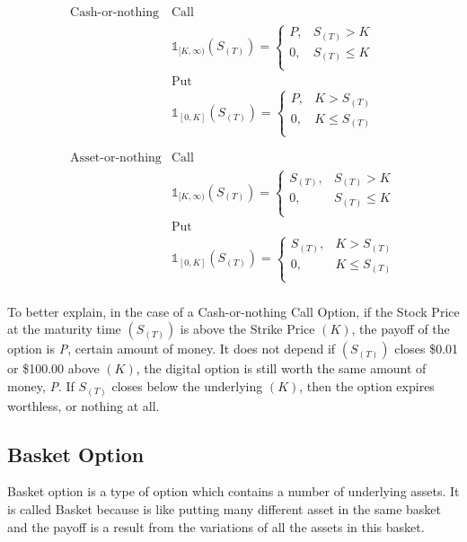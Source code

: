 \documentclass[]{elsarticle}
\theoremstyle{definition}
\theoremstyle{remark}
\begin{document}
$$ \begin{array}{rcc}
\text{Cash-or-nothing} & \text{Call}\\
 & \mathbb{1}_{[K,\infty)}(S_{(T)})=
\begin{cases}
P, & S_{(T)} > K \\
0, & S_{(T)} \leq K\\
\end{cases}\\
 & \text{Put}\\
 & \mathbb{1}_{[0,K]}(S_{(T)})=
\begin{cases}
P, & K > S_{(T)} \\
0, & K \leq S_{(T)}\\
\end{cases} \\
\\
\\
\text{Asset-or-nothing} & \text{Call}\\
& \mathbb{1}_{[K,\infty)}(S_{(T)})=
\begin{cases}
S_{(T)}, & S_{(T)} > K \\
0, & S_{(T)} \leq K\\
\end{cases}\\
& \text{Put}\\
& \mathbb{1}_{[0,K]}(S_{(T)})=
\begin{cases}
S_{(T)}, & K > S_{(T)} \\
0, & K \leq S_{(T)}\\
\end{cases} \\
\end{array} $$

To better explain, in the case of a Cash-or-nothing Call Option, if the Stock Price at the maturity time $(S_{(T)})$ is above the Strike Price $(K)$, the payoff of the option is \textit{P}, certain amount of money.  It does not depend if $(S_{(T)})$ closes \$0.01 or \$100.00 above $(K)$, the  digital option is still worth the same amount of money, \textit{P}. If $S_{(T)}$  closes below the underlying $(K)$, then the option expires worthless, or nothing at all.


\subsection{Basket Option}
Basket option is a type of option  which contains a number of underlying assets. It is called Basket because is like putting many different asset in the same basket and the payoff is a result from the variations of all the assets in this basket. 
\end{document}
